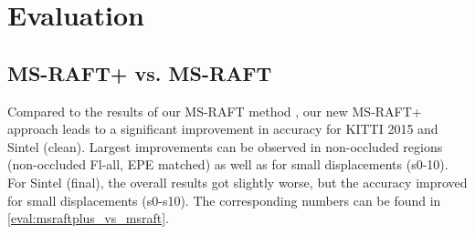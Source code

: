 \documentclass[conference,compsoc,a4paper]{IEEEtran}[2015/08/26]
\begin{document}
\section{Evaluation}
\label{subsec:evaluation}

\subsection{MS-RAFT+ vs. MS-RAFT}
Compared to the results of our MS-RAFT method  \cite{Jahedi2022_MSRAFT}, our new MS-RAFT+ approach leads to a significant improvement in accuracy for KITTI 2015 and Sintel (clean). Largest improvements can be observed in non-occluded regions (non-occluded Fl-all, EPE matched) as well as for small displacements (s0-10).
For Sintel (final), the overall results 
got slightly worse, but the accuracy improved for small displacements (s0-s10). The corresponding numbers can be found in \cref{eval:msraftplus_vs_msraft}.
\end{document}
